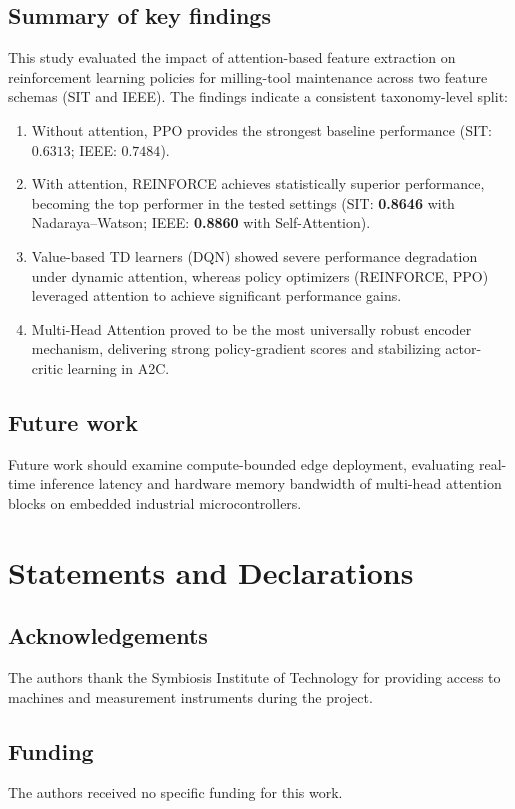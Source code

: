 \documentclass[sn-basic]{sn-jnl}%
\begin{document}
\subsection{Summary of key findings}
This study evaluated the impact of attention-based feature extraction on reinforcement learning policies for milling-tool maintenance across two feature schemas (SIT and IEEE). The findings indicate a consistent taxonomy-level split:
\begin{enumerate}
    \item Without attention, \textsc{PPO} provides the strongest baseline performance (SIT: $0.6313$; IEEE: $0.7484$).
	\item With attention, \textsc{REINFORCE} achieves statistically superior performance, becoming the top performer in the tested settings (SIT: \textbf{0.8646} with Nadaraya--Watson; IEEE: \textbf{0.8860} with Self-Attention).
    \item Value-based TD learners (\textsc{DQN}) showed severe performance degradation under dynamic attention, whereas policy optimizers (\textsc{REINFORCE}, \textsc{PPO}) leveraged attention to achieve significant performance gains.
	\item Multi-Head Attention proved to be the most universally robust encoder mechanism, delivering strong policy-gradient scores and stabilizing actor-critic learning in \textsc{A2C}.
\end{enumerate}

\subsection{Future work}
Future work should examine compute-bounded edge deployment, evaluating real-time inference latency and hardware memory bandwidth of multi-head attention blocks on embedded industrial microcontrollers.

\section*{Statements and Declarations}

\subsection*{Acknowledgements}
The authors thank the Symbiosis Institute of Technology for providing access to machines and measurement instruments during the project.

\subsection*{Funding}
The authors received no specific funding for this work.
\end{document}

